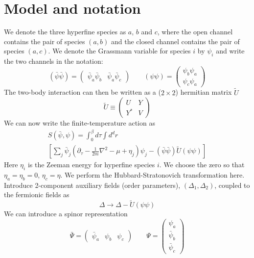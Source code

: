 \documentclass[reprint,pra]{revtex4-1}
\newcommand{\nth}[1]{\ensuremath{\frac{1}{#1}}}
\newcommand{\mbr}[1]{\ensuremath{\left[#1\right]}}
\newcommand{\mtrx}[1]{\ensuremath{\begin{pmatrix}#1\end{pmatrix}}}
\newcommand{\dg}{\ensuremath{\dagger}}
\begin{document}
\section{Model and notation\label{sec:model}}
We denote the three hyperfine species as $a$, $b$ and $c$, where the open channel contains the pair of species $(a,b)$ and the closed channel contains the pair of species $(a,c)$.  We denote the Grassmann variable for species $i$ by $\psi_i$ and write the  two channels in the notation:
\begin{equation}
(\bar\psi\bar\psi)=\mtrx{\bar\psi_{a}\bar\psi_{b}&\bar\psi_{a}\bar\psi_{c}}
\qquad(\psi\psi)=\mtrx{\psi_{b}\psi_{a}\\\psi_{c}\psi_{a}}
\end{equation}
The two-body interaction can then be written as a ($2\times2$)  hermitian  matrix  $\tilde{U}$ 
\begin{equation}
\tilde{U}\equiv{}\mtrx{U&Y\\Y^{*}&V}
\end{equation}
We can now write the finite-temperature action as 
\begin{multline}\label{eq:pathInt2:actionFermi}
S(\bar\psi,\psi)=\int^{\beta}_{0}d\tau\int{d^{d}r}\\
\mbr{\sum_{j}\bar\psi_{j}(\partial_\tau-\nth{2m}\nabla^{2}-\mu+\eta_{j})\psi_{j}
-(\bar\psi\bar\psi)\tilde{U}(\psi\psi)}
\end{multline}
Here $\eta_{i}$ is the Zeeman energy for hyperfine species $i$. We choose the zero so that $\eta_{a}=\eta_{b}=0$, $\eta_{c}=\eta$.  We  perform the Hubbard-Stratonovich transformation here.   Introduce 2-component  auxiliary fields (order parameters), $(\Delta_{1},\Delta_{2})$, coupled to the fermionic fields as 
\begin{equation}\label{eq:pathInt2:DeltaPhi}
\Delta\longrightarrow\Delta-\tilde{U}(\psi\psi)
\end{equation}
We can introduce  a spinor representation   
\begin{equation}
\bar\Psi=\mtrx{\bar\psi_{a}&\psi_{b}&\psi_{c}}\qquad\Psi=\mtrx{\psi_{a}\\\bar\psi_{b}\\\bar\psi_{c}}
\end{equation}
\end{document}
